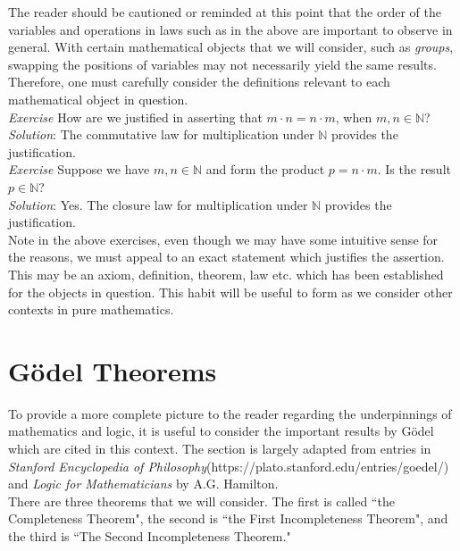 The reader should be cautioned or reminded at this point that the order of the variables and operations in laws such as in the above are important to observe in general.  With certain mathematical objects that we will consider, such as \textit{groups}, swapping the positions of variables may not necessarily yield the same results.  Therefore, one must carefully consider the definitions relevant to each mathematical object in question.\\

\textit{Exercise}  How are we justified in asserting that $m \cdot n = n \cdot m$, when $m,n \in \mathbb{N}$?\\
\textit{Solution}:  The commutative law for multiplication under $\mathbb{N}$ provides the justification.\\ 

\textit{Exercise}  Suppose we have $m,n \in \mathbb{N}$ and form the product $p=n \cdot m$.  Is the result $p \in \mathbb{N}$?\\
\textit{Solution}:  Yes.  The closure law for multiplication under $\mathbb{N}$ provides the justification.\\

Note in the above exercises, even though we may have some intuitive sense for the reasons, we must appeal to an exact statement which justifies the assertion.  This may be an axiom, definition, theorem, law etc. which has been established for the objects in question.  This habit will be useful to form as we consider other contexts in pure mathematics.

\section{G\"odel Theorems}

To provide a more complete picture to the reader regarding the underpinnings of mathematics and logic, it is useful to consider the important results by G{\"o}del which are cited in this context.  The section is largely adapted from entries in \textit{Stanford Encyclopedia of Philosophy}(https://plato.stanford.edu/entries/goedel/) and \textit{Logic for Mathematicians} by A.G. Hamilton.\\

There are three theorems that we will consider.  The first is called ``the Completeness Theorem", the second is ``the First Incompleteness Theorem", and the third is ``The Second Incompleteness Theorem."\\


